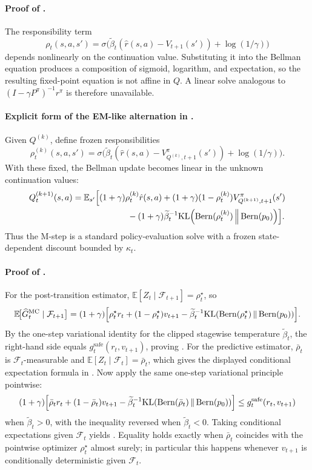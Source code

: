 \documentclass{article}
\theoremstyle{remark}
\DeclareMathOperator{\Bern}{Bern}
\newcommand{\E}{\mathbb{E}}
\newcommand{\KL}{\mathrm{KL}}
\newcommand{\pprior}{p_0}
\newcommand{\KLbin}[2]{\KL\!\left(\Bern(#1)\,\middle\|\,\Bern(#2)\right)}
\newcommand{\safe}{\mathrm{safe}}
\begin{document}
\paragraph{Proof of .}
The responsibility term
\[
\rho_t(s,a,s')=\sigma\!\bigl(\widetilde\beta_t(\hat r(s,a)-V_{t+1}(s'))+\log(1/\gamma)\bigr)
\]
depends nonlinearly on the continuation value.
Substituting it into the Bellman equation produces a composition of sigmoid, logarithm, and expectation, so the resulting fixed-point equation is not affine in $Q$.
A linear solve analogous to $(I-\gamma P^\pi)^{-1}r^\pi$ is therefore unavailable.

\paragraph{Explicit form of the EM-like alternation in .}
Given $Q^{(k)}$, define frozen responsibilities
\[
\rho_t^{(k)}(s,a,s')=\sigma\!\bigl(\widetilde\beta_t(\hat r(s,a)-V_{Q^{(k)},t+1}^{\pi}(s'))+\log(1/\gamma)\bigr).
\]
With these fixed, the Bellman update becomes linear in the unknown continuation values:
\begin{align*}
Q_{t}^{(k+1)}(s,a)
&=\E_{s'}\Bigl[
    (1+\gamma)\rho_t^{(k)}\hat r(s,a)
    +(1+\gamma)(1-\rho_t^{(k)})V_{Q^{(k+1)},t+1}^{\pi}(s') \\
&\hspace{6.5em}
    -(1+\gamma)\widetilde\beta_t^{-1}\KLbin{\rho_t^{(k)}}{\pprior}
\Bigr].
\end{align*}
Thus the M-step is a standard policy-evaluation solve with a frozen state-dependent discount bounded by $\kappa_t$.

\paragraph{Proof of .}
For the post-transition estimator, $\E[Z_t\mid \mathcal F_{t+1}]=\rho_t^\star$, so
\[
\E\!\bigl[\widehat G_t^{\mathrm{MC}}\mid \mathcal F_{t+1}\bigr]
=(1+\gamma)\Bigl[\rho_t^\star r_t +(1-\rho_t^\star)v_{t+1}-\widetilde\beta_t^{-1}\KLbin{\rho_t^\star}{\pprior}\Bigr].
\]
By the one-step variational identity for the clipped stagewise temperature $\widetilde\beta_t$, the right-hand side equals $g_t^{\safe}(r_t,v_{t+1})$, proving .
For the predictive estimator, $\bar\rho_t$ is $\mathcal F_t$-measurable and $\E[Z_t\mid \mathcal F_t]=\bar\rho_t$, which gives the displayed conditional expectation formula in .
Now apply the same one-step variational principle pointwise:
\[
(1+\gamma)\Bigl[\bar\rho_t r_t +(1-\bar\rho_t)v_{t+1}-\widetilde\beta_t^{-1}\KLbin{\bar\rho_t}{\pprior}\Bigr]
\le g_t^{\safe}(r_t,v_{t+1})
\]
when $\widetilde\beta_t>0$, with the inequality reversed when $\widetilde\beta_t<0$.
Taking conditional expectations given $\mathcal F_t$ yields .
Equality holds exactly when $\bar\rho_t$ coincides with the pointwise optimizer $\rho_t^\star$ almost surely; in particular this happens whenever $v_{t+1}$ is conditionally deterministic given $\mathcal F_t$.
\end{document}
